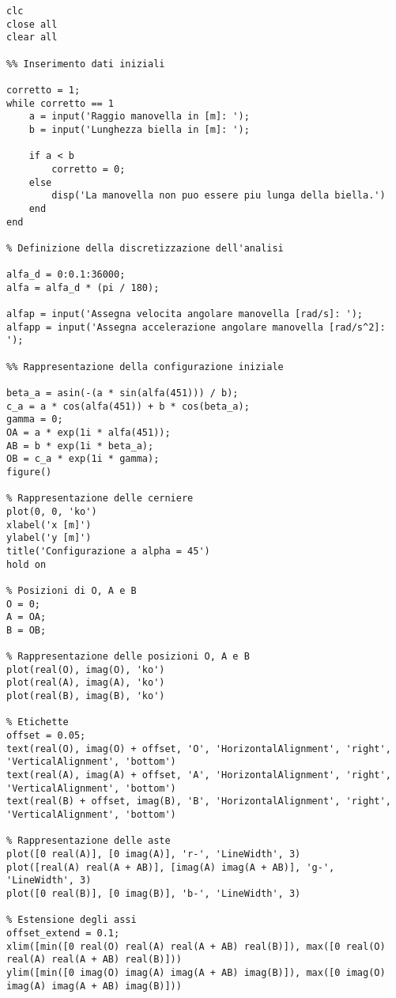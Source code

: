 \documentclass{article}
\begin{document}
\begin{lstlisting}[basicstyle=\footnotesize]
clc
close all
clear all

%% Inserimento dati iniziali

corretto = 1;
while corretto == 1
    a = input('Raggio manovella in [m]: ');
    b = input('Lunghezza biella in [m]: ');

    if a < b
        corretto = 0;
    else
        disp('La manovella non puo essere piu lunga della biella.')
    end
end

% Definizione della discretizzazione dell'analisi

alfa_d = 0:0.1:36000;                                                       
alfa = alfa_d * (pi / 180);                                               

alfap = input('Assegna velocita angolare manovella [rad/s]: ');  
alfapp = input('Assegna accelerazione angolare manovella [rad/s^2]: ');                                                                

%% Rappresentazione della configurazione iniziale

beta_a = asin(-(a * sin(alfa(451))) / b);
c_a = a * cos(alfa(451)) + b * cos(beta_a);
gamma = 0;
OA = a * exp(1i * alfa(451));
AB = b * exp(1i * beta_a);
OB = c_a * exp(1i * gamma);
figure()

% Rappresentazione delle cerniere
plot(0, 0, 'ko')
xlabel('x [m]')
ylabel('y [m]')
title('Configurazione a alpha = 45')
hold on

% Posizioni di O, A e B
O = 0;
A = OA;
B = OB;

% Rappresentazione delle posizioni O, A e B
plot(real(O), imag(O), 'ko')
plot(real(A), imag(A), 'ko')
plot(real(B), imag(B), 'ko')

% Etichette
offset = 0.05;
text(real(O), imag(O) + offset, 'O', 'HorizontalAlignment', 'right', 'VerticalAlignment', 'bottom')
text(real(A), imag(A) + offset, 'A', 'HorizontalAlignment', 'right', 'VerticalAlignment', 'bottom')
text(real(B) + offset, imag(B), 'B', 'HorizontalAlignment', 'right', 'VerticalAlignment', 'bottom')

% Rappresentazione delle aste
plot([0 real(A)], [0 imag(A)], 'r-', 'LineWidth', 3)
plot([real(A) real(A + AB)], [imag(A) imag(A + AB)], 'g-', 'LineWidth', 3)
plot([0 real(B)], [0 imag(B)], 'b-', 'LineWidth', 3)

% Estensione degli assi
offset_extend = 0.1;
xlim([min([0 real(O) real(A) real(A + AB) real(B)]), max([0 real(O) real(A) real(A + AB) real(B)]))
ylim([min([0 imag(O) imag(A) imag(A + AB) imag(B)]), max([0 imag(O) imag(A) imag(A + AB) imag(B)]))


\end{lstlisting}
\end{document}
